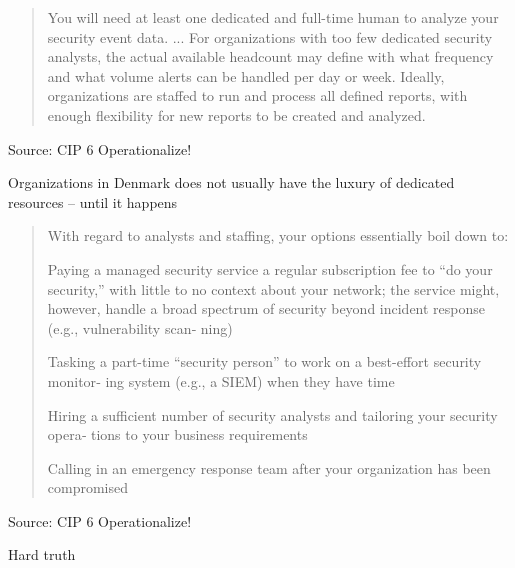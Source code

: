 \documentclass[Screen16to9,17pt]{foils}
\begin{document}


\begin{quote}
You will need at least one dedicated and full-time human to analyze your security event data.
  ...
For organizations with too few dedicated security analysts, the actual available headcount may define with what frequency and what volume alerts can be handled per day or week. Ideally, organizations are staffed to run and process all defined reports, with enough flexibility for new reports to be created and analyzed.
\end{quote}
Source: CIP 6 Operationalize!

\begin{list2}
\item Organizations in Denmark does not usually have the luxury of dedicated resources -- until it happens
\end{list2}



\begin{quote}

With regard to analysts and staffing, your options essentially boil down to:
\begin{list2}
\item Paying a managed security service a regular subscription fee to “do your security,”
  with little to no context about your network; the service might, however, handle a
  broad spectrum of security beyond incident response (e.g., vulnerability scan‐
  ning)
\item Tasking a part-time “security person” to work on a best-effort security monitor‐
  ing system (e.g., a SIEM) when they have time
\item Hiring a sufficient number of security analysts and tailoring your security opera‐
tions to your business requirements
\item Calling in an emergency response team after your organization has been compromised
\end{list2}
\end{quote}
Source: CIP 6 Operationalize!

\begin{list2}
  \item Hard truth
\end{list2}



\end{document}

